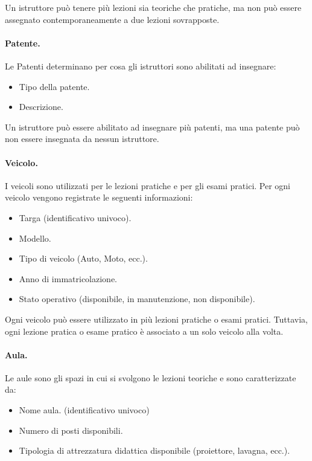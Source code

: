 \documentclass[10pt,twoside]{article}
\begin{document}
{    Un istruttore può tenere più lezioni sia teoriche che pratiche, ma non può essere assegnato contemporaneamente a due lezioni sovrapposte.
    

    \paragraph{Patente.}
    Le Patenti determinano per cosa gli istruttori sono abilitati ad insegnare:
    
    \begin{itemize}
        \item Tipo della patente. 
        \item Descrizione.
    \end{itemize}

    Un istruttore può essere abilitato ad insegnare più patenti, ma una patente può non essere insegnata da nessun istruttore.

    \paragraph{Veicolo.}
    I veicoli sono utilizzati per le lezioni pratiche e per gli esami pratici. Per ogni veicolo vengono registrate le seguenti informazioni:
    
    \begin{itemize}
        \item Targa (identificativo univoco).
        \item Modello.
        \item Tipo di veicolo (Auto, Moto, ecc.).
        \item Anno di immatricolazione.
        \item Stato operativo (disponibile, in manutenzione, non disponibile).
    \end{itemize}

    Ogni veicolo può essere utilizzato in più lezioni pratiche o esami pratici. Tuttavia, ogni lezione pratica o esame pratico è associato a un solo veicolo alla volta.
    

    \paragraph{Aula.}
    Le aule sono gli spazi in cui si svolgono le lezioni teoriche e sono caratterizzate da:

    \begin{itemize}
        \item Nome aula. (identificativo univoco)
        \item Numero di posti disponibili.
        \item Tipologia di attrezzatura didattica disponibile (proiettore, lavagna, ecc.).
    \end{itemize}

}
\end{document}

